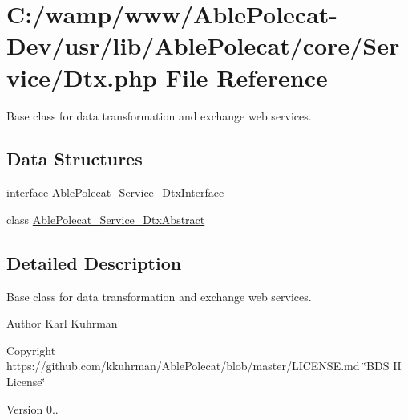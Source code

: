 \hypertarget{_dtx_8php}{}\section{C\+:/wamp/www/\+Able\+Polecat-\/\+Dev/usr/lib/\+Able\+Polecat/core/\+Service/\+Dtx.php File Reference}
\label{_dtx_8php}


Base class for data transformation and exchange web services.  


\subsection*{Data Structures}
\begin{DoxyCompactItemize}
\item 
interface \hyperlink{interface_able_polecat___service___dtx_interface}{Able\+Polecat\+\_\+\+Service\+\_\+\+Dtx\+Interface}
\item 
class \hyperlink{class_able_polecat___service___dtx_abstract}{Able\+Polecat\+\_\+\+Service\+\_\+\+Dtx\+Abstract}
\end{DoxyCompactItemize}


\subsection{Detailed Description}
Base class for data transformation and exchange web services. 

\begin{DoxyAuthor}{Author}
Karl Kuhrman 
\end{DoxyAuthor}
\begin{DoxyCopyright}{Copyright}
https\+://github.com/kkuhrman/\+Able\+Polecat/blob/master/\+L\+I\+C\+E\+N\+S\+E.\+md \char`\"{}\+B\+D\+S I\+I License\char`\"{} 
\end{DoxyCopyright}
\begin{DoxyVersion}{Version}
0.. 
\end{DoxyVersion}
